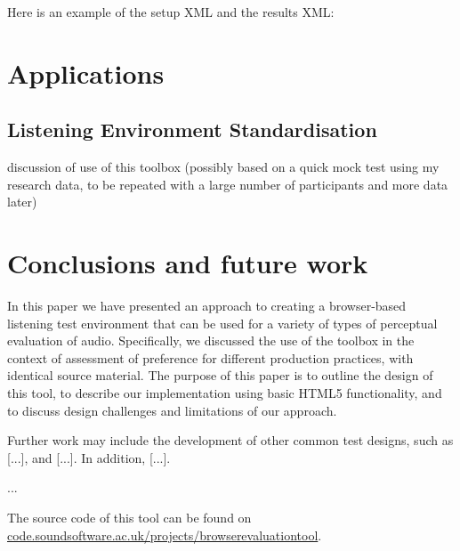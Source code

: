 \documentclass{article}
\begin{document}
Here is an example of the setup XML and the results XML:

\section{Applications}\label{sec:applications} %

\subsection{Listening Environment Standardisation}


discussion of use of this toolbox (possibly based on a quick mock test using my research data, to be repeated with a large number of participants and more data later)\\


\section{Conclusions and future work}\label{sec:conclusions}

In this paper we have presented an approach to creating a browser-based listening test environment that can be used for a variety of types of perceptual evaluation of audio. 
Specifically, we discussed the use of the toolbox in the context of assessment of preference for different production practices, with identical source material. 
The purpose of this paper is to outline the design of this tool, to describe our implementation using basic HTML5 functionality, and to discuss design challenges and limitations of our approach. %

Further work may include the development of other common test designs, such as [...], and [...]. In addition, [...]. 

...

The source code of this tool can be found on \url{code.soundsoftware.ac.uk/projects/browserevaluationtool}.



\end{document}
